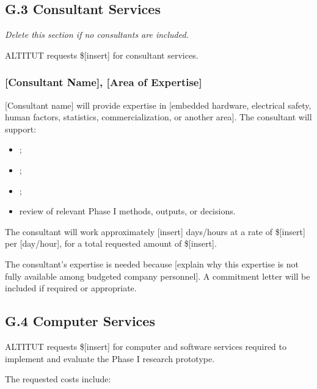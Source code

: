 \documentclass[11pt,letterpaper]{article}
\begin{document}
\subsection*{G.3 Consultant Services}

\textit{Delete this section if no consultants are included.}

ALTITUT requests \$[insert] for consultant services.

\subsubsection*{[Consultant Name], [Area of Expertise]}

[Consultant name] will provide expertise in [embedded hardware, electrical
safety, human factors, statistics, commercialization, or another area]. The
consultant will support:

\begin{itemize}
    \item [Insert specific deliverable];
    \item [Insert specific deliverable];
    \item [Insert specific deliverable];
    \item review of relevant Phase I methods, outputs, or decisions.
\end{itemize}

The consultant will work approximately [insert] days/hours at a rate of
\$[insert] per [day/hour], for a total requested amount of \$[insert].

The consultant's expertise is needed because [explain why this expertise is
not fully available among budgeted company personnel]. A commitment letter
will be included if required or appropriate.

\subsection*{G.4 Computer Services}

ALTITUT requests \$[insert] for computer and software services required to
implement and evaluate the Phase I research prototype.

The requested costs include:
\end{document}

